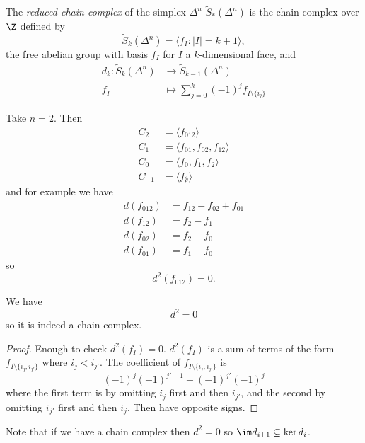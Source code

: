 \documentclass[a4paper]{article}
\begin{document}
\begin{definition}
  The \emph{reduced chain complex} of the simplex \(\Delta^n\) \(\widetilde S_*(\Delta^n)\) is the chain complex over \(\Z\) defined by
  \[
    \widetilde S_k(\Delta^n) = \langle f_I: |I| = k + 1 \rangle,
  \]
  the free abelian group with basis \(f_I\) for \(I\) a \(k\)-dimensional face, and
  \begin{align*}
    d_k: \widetilde S_k(\Delta^n) &\to \widetilde S_{k - 1}(\Delta^n) \\
    f_I &\mapsto \sum_{j = 0}^k (-1)^j f_{I \setminus \{i_j\}}
  \end{align*}
\end{definition}

\begin{eg}
  Take \(n = 2\). Then
  \begin{align*}
    C_2 &= \langle f_{012} \rangle \\
    C_1 &= \langle f_{01}, f_{02}, f_{12} \rangle \\
    C_0 &= \langle f_0, f_1, f_2 \rangle \\
    C_{-1} &= \langle f_\emptyset \rangle
  \end{align*}
  and for example we have
  \begin{align*}
    d(f_{012}) &= f_{12} - f_{02} + f_{01} \\
    d(f_{12}) &= f_2 - f_1 \\
    d(f_{02}) &= f_2 - f_0 \\
    d(f_{01}) &= f_1 - f_0
  \end{align*}
  so
  \[
    d^2(f_{012}) = 0.
  \]
\end{eg}

\begin{proposition}
  We have
  \[
    d^2 = 0
  \]
  so it is indeed a chain complex.
\end{proposition}

\begin{proof}
  Enough to check \(d^2(f_I) = 0\). \(d^2(f_I)\) is a sum of terms of the form \(f_{I \setminus \{i_j, i_{j'}\}}\) where \(i_j < i_{j'}\). The coefficient of \(f_{I \setminus \{i_j, i_{j'}\}}\) is
  \[
    (-1)^j (-1)^{j' - 1} + (-1)^{j'} (-1)^{j}
  \]
  where the first term is by omitting \(i_j\) first and then \(i_{j'}\), and the second by omitting \(i_{j'}\) first and then \(i_j\). Then have opposite signs.
\end{proof}

Note that if we have a chain complex then \(d^2 = 0\) so \(\im d_{i + 1} \subseteq \ker d_i\).
\end{document}
